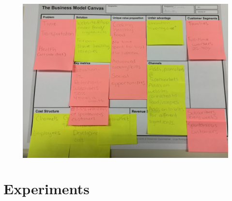 \documentclass[12pt]{article}
\begin{document}
\begin{figure}[ht]
\centering
\includegraphics[scale=0.25]{IMG_0311.JPG}
\label{first-canvas}
\end{figure}

\section{Experiments}
\end{document}
